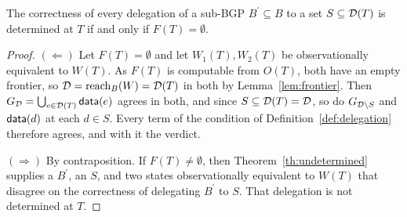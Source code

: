 \begin{corollary}
  \label{cor:complete-discovery}
  The correctness of every delegation of a sub-BGP $B^{\prime} \subseteq B$ to a set
  $S \subseteq \mathcal{D}(T)$ is determined at $T$ if and only if $F(T) = \emptyset$.
\end{corollary}

\begin{proof}
  $(\Leftarrow)$ Let $F(T) = \emptyset$ and let $W_1(T), W_2(T)$ be observationally
  equivalent to $W(T)$. As $F(T)$ is computable from $O(T)$, both have an empty frontier,
  so $\mathcal{D} = \mathrm{reach}_B(W) = \mathcal{D}(T)$ in both by Lemma~\ref{lem:frontier}. Then
  $G_{\mathcal{D}} = \bigcup_{e \in \mathcal{D}(T)} \mathsf{data}(e)$ agrees in both, and since
  $S \subseteq \mathcal{D}(T) = \mathcal{D}$, so do $G_{\mathcal{D} \setminus S}$ and $\mathsf{data}(d)$ at each
  $d \in S$. Every term of the condition of Definition~\ref{def:delegation} therefore
  agrees, and with it the verdict.

  $(\Rightarrow)$ By contraposition. If $F(T) \neq \emptyset$, then
  Theorem~\ref{th:undetermined} supplies a $B^{\prime}$, an $S$, and two states
  observationally equivalent to $W(T)$ that disagree on the correctness of delegating
  $B^{\prime}$ to $S$. That delegation is not determined at $T$.
\end{proof}

